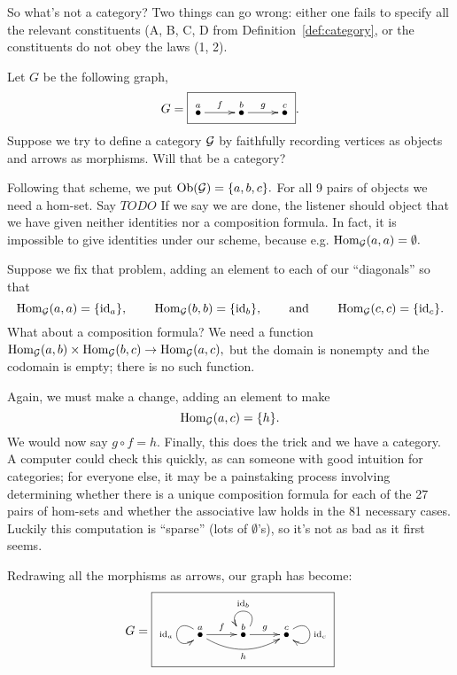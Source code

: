 \documentclass[../main/CT4S-EN-RU]{subfiles}
\begin{document}
\begin{exampleENG}
So what's not a category? Two things can go wrong: either one fails to specify all the relevant constituents (A, B, C, D from Definition~\ref{def:category}, or the constituents do not obey the laws (1, 2).

Let $G$ be the following graph,
$$G=\fbox{\xymatrix{\LMO{a}\ar[r]^f&\LMO{b}\ar[r]^g&\LMO{c}}}.$$
Suppose we try to define a category $\mathcal{G}$ by faithfully recording vertices as objects and arrows as morphisms. Will that be a category?

Following that scheme, we put $\operatorname{Ob}(\mathcal{G})=\{a,b,c\}.$ For all 9 pairs of objects we need a hom-set.
Say 
$TODO$%
If we say we are done, the listener should object that we have given neither identities nor a composition formula. In fact, it is impossible to give identities under our scheme, because e.g. $\operatorname{Hom}_\mathcal{G}(a,a)=\emptyset.$

Suppose we fix that problem, adding an element to each of our “diagonals” so that 
$$\operatorname{Hom}_\mathcal{G}(a,a)=\{\operatorname{id}_a\},\hspace{.3in}\operatorname{Hom}_\mathcal{G}(b,b)=\{\operatorname{id}_b\},\hspace{.3in}\textnormal{and}\hspace{.3in}\operatorname{Hom}_\mathcal{G}(c,c)=\{\operatorname{id}_c\}.$$ What about a composition formula? We need a function $\operatorname{Hom}_\mathcal{G}(a,b)\times\operatorname{Hom}_\mathcal{G}(b,c)\rightarrow\operatorname{Hom}_\mathcal{G}(a,c),$ but the domain is nonempty and the codomain is empty; there is no such function. 

Again, we must make a change, adding an element to make $$\operatorname{Hom}_\mathcal{G}(a,c)=\{h\}.$$ We would now say $g\circ f=h.$ Finally, this does the trick and we have a category. A computer could check this quickly, as can someone with good intuition for categories; for everyone else, it may be a painstaking process involving determining whether there is a unique composition formula for each of the 27 pairs of hom-sets and whether the associative law holds in the 81 necessary cases. Luckily this computation is “sparse” (lots of $\emptyset$'s), so it's not as bad as it first seems.

Redrawing all the morphisms as arrows, our graph has become:
$$G=\fbox{\xymatrix{\LMO{a}\ar@(ul,dl)[]_{\id_a}\ar[r]^f\ar@/_1pc/[rr]_h&\LMO{b}\ar@(ur,ul)[]_{\id_b}\ar[r]^g&\LMO{c}\ar@(ur,dr)[]^{\id_c}}}$$
\end{exampleENG}

\begin{exampleRUS}
\end{exampleRUS}
\end{document}

